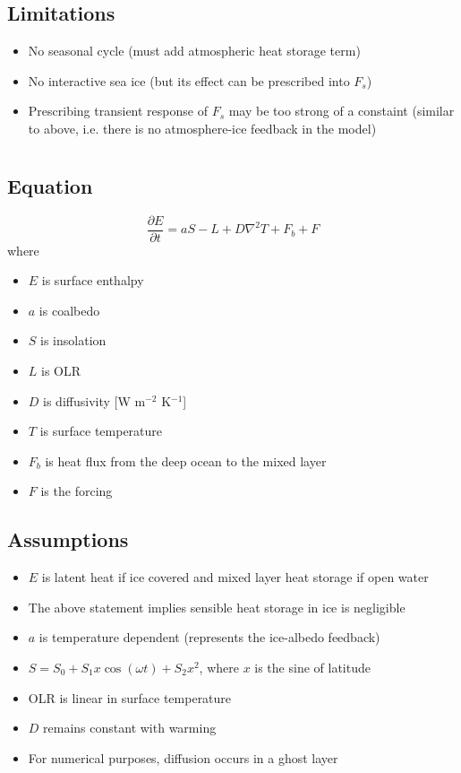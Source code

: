 \documentclass{article}
\begin{document}
\subsection{Limitations}
\begin{itemize}
    \item No seasonal cycle (must add atmospheric heat storage term)
    \item No interactive sea ice (but its effect can be prescribed into $F_s$)
    \item Prescribing transient response of $F_s$ may be too strong of a constaint (similar to above, i.e. there is no atmosphere-ice feedback in the model)
\end{itemize}

\section{\cite{wagner2015}}
\subsection{Equation}
\begin{equation}
    \frac{\partial E}{\partial t} = aS - L + D\nabla^2T + F_b + F
\end{equation}
where
\begin{itemize}
    \item $E$ is surface enthalpy
    \item $a$ is coalbedo
    \item $S$ is insolation
    \item $L$ is OLR
    \item $D$ is diffusivity [W m$^{-2}$ K$^{-1}$]
    \item $T$ is surface temperature
    \item $F_b$ is heat flux from the deep ocean to the mixed layer
    \item $F$ is the forcing
\end{itemize}

\subsection{Assumptions}
\begin{itemize}
    \item $E$ is latent heat if ice covered and mixed layer heat storage if open water
    \item The above statement implies sensible heat storage in ice is negligible
    \item $a$ is temperature dependent (represents the ice-albedo feedback)
    \item $S = S_0 + S_1x\cos(\omega t) + S_2x^2$, where $x$ is the sine of latitude
    \item OLR is linear in surface temperature
    \item $D$ remains constant with warming
    \item For numerical purposes, diffusion occurs in a ghost layer
\end{itemize}
\end{document}
